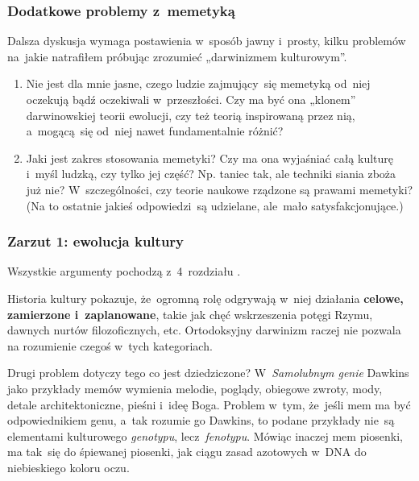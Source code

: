 \documentclass[10pt,t]{beamer}
\begin{document}
\begin{frame}
  \frametitle{Dodatkowe problemy z~memetyką}


  Dalsza dyskusja wymaga postawienia w~sposób jawny i~prosty, kilku
  problemów na~jakie natrafiłem próbując zrozumieć „darwinizmem
  kulturowym”.

  \begin{enumerate}
    \RaggedRight

  \item Nie jest dla mnie jasne, czego ludzie zajmujący~się memetyką
    od~niej oczekują bądź oczekiwali w~przeszłości. Czy ma być ona
    „klonem” darwinowskiej teorii ewolucji, czy też teorią inspirowaną
    przez nią, a~mogącą~się od~niej nawet fundamentalnie różnić?

  \item Jaki jest zakres stosowania memetyki? Czy ma ona wyjaśniać
    całą kulturę i~myśl ludzką, czy tylko jej część? Np. taniec tak,
    ale techniki siania zboża już nie? W~szczególności, czy teorie
    naukowe rządzone są prawami memetyki? (Na to ostatnie jakieś
    odpowiedzi~są udzielane, ale~mało satysfakcjonujące.)

  \end{enumerate}

\end{frame}





\begin{frame}
  \frametitle{Zarzut 1: ewolucja kultury}

  Wszystkie argumenty pochodzą z~4~rozdziału \cite{McGrathBogDawkinsa2008}.

  Historia kultury pokazuje, że~ogromną rolę odgrywają w~niej działania
  \textbf{celowe, zamierzone i~zaplanowane}, takie jak chęć wskrzeszenia
  potęgi Rzymu, dawnych nurtów filozoficznych, etc. Ortodoksyjny darwinizm
  raczej nie pozwala na rozumienie czegoś w~tych kategoriach.


  Drugi problem dotyczy tego co jest dziedziczone?
  W~\textit{Samolubnym genie} Dawkins jako przykłady memów wymienia
  melodie, poglądy, obiegowe zwroty, mody, detale architektoniczne,
  pieśni i~ideę Boga. Problem w~tym, że~jeśli mem ma być
  odpowiednikiem genu, a~tak rozumie go Dawkins, to podane przykłady
  nie~są elementami kulturowego \textit{genotypu}, lecz~\textit{fenotypu}.
  Mówiąc inaczej mem piosenki, ma tak~się do śpiewanej piosenki, jak
  ciągu zasad azotowych w~DNA do niebieskiego koloru oczu.

\end{frame}
\end{document}
